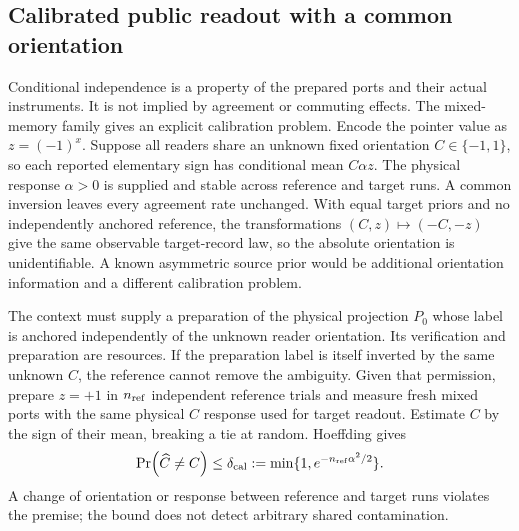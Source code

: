\documentclass[12pt,a4paper]{article}
\begin{document}
\subsection{Calibrated public readout with a common orientation}
\label{sec:calibrated}

Conditional independence is a property of the prepared ports and
their actual instruments. It is not implied by agreement or
commuting effects. The mixed-memory family gives an explicit
calibration problem. Encode the pointer value as $z=(-1)^x$.
Suppose all readers share an unknown fixed orientation
$C\in\{-1,1\}$, so each reported elementary sign has conditional
mean $C\alpha z$. The physical response $\alpha>0$ is supplied
and stable across reference and target runs. A common inversion
leaves every agreement rate unchanged. With equal target priors
and no independently anchored reference, the transformations
$(C,z)\mapsto(-C,-z)$ give the same observable target-record law,
so the absolute orientation is unidentifiable. A known asymmetric
source prior would be additional orientation information and a
different calibration problem.

The context must supply a preparation of the physical projection
$P_0$ whose label is anchored independently of the unknown reader
orientation. Its verification and preparation are resources.
If the preparation label is itself inverted by the same unknown
$C$, the reference cannot remove the ambiguity. Given that permission,
prepare $z=+1$ in $n_{\rm ref}$ independent reference trials and
measure fresh mixed ports with the same physical $C$ response used
for target readout. Estimate $C$ by the sign of their mean, breaking a
tie at random. Hoeffding gives
\begin{equation}\label{eq:orientation-calibration}
 \Pr(\widehat C\ne C)\le
 \delta_{\rm cal}:=\min\{1,e^{-n_{\rm ref}\alpha^2/2}\}.
\end{equation}
A change of orientation or response between reference and target
runs violates the premise; the bound does not detect arbitrary
shared contamination.
\end{document}
